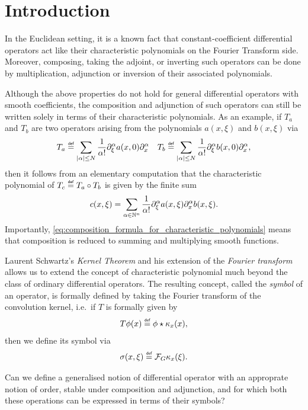 \chapter{Introduction}

In the Euclidean setting,
it is a known fact that constant-coefficient differential operators act like their characteristic polynomials on the Fourier Transform side.
Moreover, composing, taking the adjoint, or inverting such operators can be done by multiplication, adjunction or inversion of their associated polynomials.

Although the above properties do not hold for general differential operators with smooth coefficients,
the composition and adjunction of such operators can still be written solely in terms of their characteristic polynomials.
As an example,
if $T_a$ and $T_b$ are two operators arising from the polynomials $a(x, \xi)$ and $b(x, \xi)$ via
\begin{align*}
    T_a \defeq \sum_{\abs \alpha \leq N} \frac 1 {\alpha!} \iD{\xi^\alpha} a(x, 0) \iD{x^\alpha}
    \quad
    T_b \defeq \sum_{\abs \alpha \leq N} \frac 1 {\alpha!} \iD{\xi^\alpha} b(x, 0) \iD{x^\alpha},
\end{align*}
then it follows from an elementary computation
that the characteristic polynomial of $T_c \defeq T_a \circ T_b$ is given by the finite sum
\begin{align}
    c(x, \xi) = \sum_{\alpha \in \N^n} \frac 1 {\alpha!} \iD{\xi^\alpha} a(x, \xi) \iD{x^\alpha} b(x, \xi)
    \label{eq:composition_formula_for_characteristic_polynomials}.
\end{align}
Importantly,
\eqref{eq:composition_formula_for_characteristic_polynomials} means that
composition is reduced to summing and multiplying smooth functions.

Laurent Schwartz's \emph{Kernel Theorem} and his extension of the \emph{Fourier transform} allows us to extend the concept of characteristic polynomial much beyond the class of ordinary differential operators.
The resulting concept, called the \emph{symbol} of an operator,
is formally defined by taking the Fourier transform of the convolution kernel,
i.e.\ if $T$ is formally given by
\begin{align*}
    T \phi(x) \defeq \conv \phi {\kappa_x}(x),
\end{align*}
then we define its symbol via
\begin{align*}
    \sigma(x, \xi) \defeq \Fourier \kappa_x(\xi).
\end{align*}

Can we define a generalised notion of differential operator
with an approprate notion of order,
stable under composition and adjunction,
and for which both these operations can be expressed in terms of their symbols?
